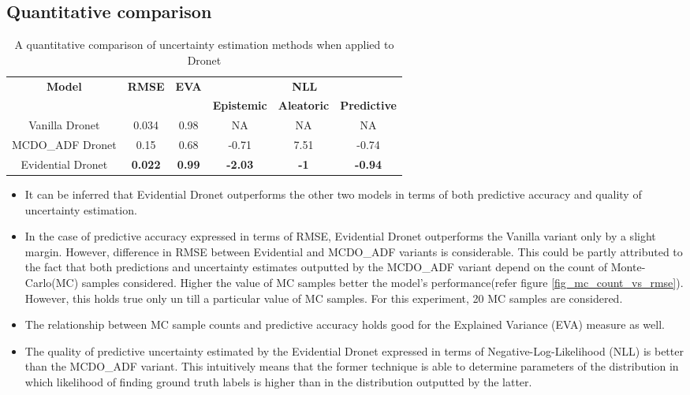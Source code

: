 \subsection{Quantitative comparison}
\begin{table}[h!]
	\centering
	\begin{tabular}{|c|c|c|c|c|c|}
		\hline
		\multirow{2}{*}{\textbf{Model}} & \multirow{2}{*}{\textbf{RMSE}} & \multirow{2}{*}{\textbf{EVA}} & \multicolumn{3}{c|}{\textbf{NLL}}                             \\ \cline{4-6} 
		&                                &                               & \textbf{Epistemic} & \textbf{Aleatoric} & \textbf{Predictive} \\ \hline
		Vanilla Dronet                  & 0.034                          & 0.98                          & NA                 & NA                 & NA                  \\ \hline
		MCDO\_ADF Dronet                & 0.15                           & 0.68                          & -0.71              & 7.51               & -0.74               \\ \hline
		Evidential Dronet               & \textbf{0.022}                 & \textbf{0.99}                 & \textbf{-2.03}     & \textbf{-1}        & \textbf{-0.94}      \\ \hline
	\end{tabular}
\caption{A quantitative comparison of uncertainty estimation methods when applied to Dronet}
\label{tab_quant_compare}
\end{table}
\begin{itemize}
	\item It can be inferred that Evidential Dronet outperforms the other two models in terms of both predictive accuracy and quality of uncertainty estimation.
	\item In the case of predictive accuracy expressed in terms of RMSE, Evidential Dronet outperforms the Vanilla variant only by a slight margin. However, difference in RMSE between Evidential and MCDO\_ADF variants is considerable. This could be partly attributed to the fact that both predictions and uncertainty estimates outputted by the MCDO\_ADF variant depend on the count of Monte-Carlo(MC) samples considered. Higher the value of MC samples better the model's performance(refer figure \ref{fig_mc_count_vs_rmse}).  However, this holds true only un till a particular value of MC samples. For this experiment, 20 MC samples are considered. 
	\item The relationship between MC sample counts and predictive accuracy holds good for the Explained Variance (EVA) measure as well.
	\item The quality of predictive uncertainty estimated by the Evidential Dronet expressed in terms of Negative-Log-Likelihood (NLL) is better than the MCDO\_ADF variant. This intuitively means that the former technique is able to determine parameters of the distribution in which likelihood of finding ground truth labels is higher than in the distribution outputted by the latter.
\end{itemize}

